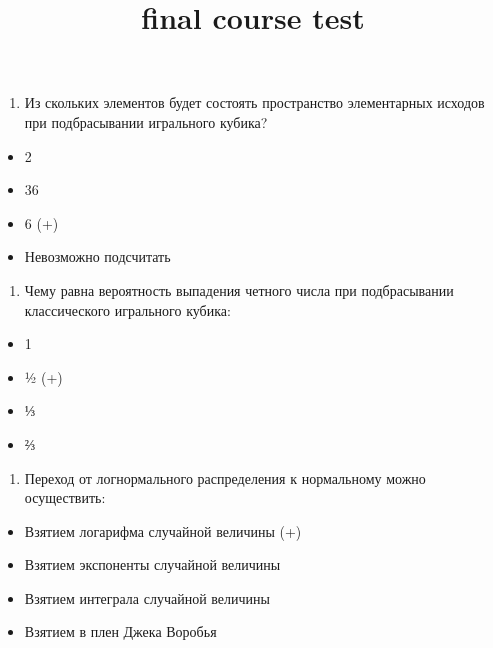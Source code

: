 \documentclass[11pt]{article}
\title{final course test}
\providecommand{\tightlist}{%
      \setlength{\itemsep}{0pt}\setlength{\parskip}{0pt}}
\begin{document}
    
    
    \maketitle
    
    

    
    \begin{enumerate}
\def\labelenumi{\arabic{enumi})}
\tightlist
\item
  Из скольких элементов будет состоять пространство элементарных исходов
  при подбрасывании игрального кубика?
\end{enumerate}

\begin{itemize}
\tightlist
\item
  2
\item
  36
\item
  6 (+)
\item
  Невозможно подсчитать
\end{itemize}

    \begin{enumerate}
\def\labelenumi{\arabic{enumi})}
\setcounter{enumi}{1}
\tightlist
\item
  Чему равна вероятность выпадения четного числа при подбрасывании
  классического игрального кубика:
\end{enumerate}

\begin{itemize}
\tightlist
\item
  1
\item
  ½ (+)
\item
  ⅓
\item
  ⅔
\end{itemize}

    \begin{enumerate}
\def\labelenumi{\arabic{enumi})}
\setcounter{enumi}{2}
\tightlist
\item
  Переход от логнормального распределения к нормальному можно
  осуществить:
\end{enumerate}

\begin{itemize}
\tightlist
\item
  Взятием логарифма случайной величины (+)
\item
  Взятием экспоненты случайной величины
\item
  Взятием интеграла случайной величины
\item
  Взятием в плен Джека Воробья
\end{itemize}
\end{document}
